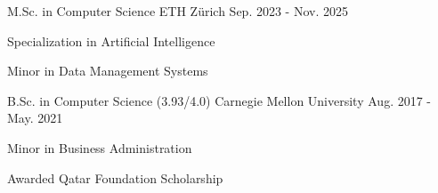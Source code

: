 

\begin{cventries}

\cventry
{M.Sc. in Computer Science} %
{ETH Zürich} %
{} %
{Sep. 2023 - Nov. 2025} %
{
  \begin{cvitems} %
    \item {Specialization in Artificial Intelligence}
    \item {Minor in Data Management Systems}
  \end{cvitems}
}

\cventry
{B.Sc. in Computer Science (3.93/4.0)} %
{Carnegie Mellon University} %
{} %
{Aug. 2017 - May. 2021} %
{
  \begin{cvitems} %
    \item {Minor in Business Administration}
    \item {Awarded Qatar Foundation Scholarship}
  \end{cvitems}
}

\end{cventries}
